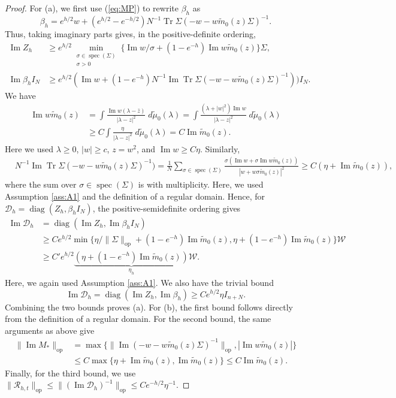 \documentclass[11pt,reqno]{amsart}
\def\cR{\mathcal{R}}
\def\cW{\mathcal{W}}
\def\cD{\mathcal{D}}
\def\Im{\operatorname{Im}}
\def\op{\mathrm{op}}
\def\Tr{\operatorname{Tr}}
\def\diag{\operatorname{diag}}
\def\spec{\operatorname{spec}}
\theoremstyle{definition}
\numberwithin{equation}{section}
\numberwithin{figure}{section}
\begin{document}
\begin{proof}
For (a), we first use (\ref{eq:MP}) to rewrite $\beta_h$ as
\[
    \beta_h=e^{h/2}w+(e^{h/2}-e^{-h/2})N^{-1}\Tr\Sigma(-w-w\widetilde m_0(z)\Sigma)^{-1}.
\]
Thus, taking imaginary parts gives, in the positive-definite ordering,
\begin{align*}
    \Im Z_{h}&\geq e^{h/2}\min_{\substack{\sigma\in\spec(\Sigma)\\\sigma>0}}\{\Im{w}/\sigma+(1-e^{-h})\Im{w\widetilde{m}_0(z)}\}\Sigma,\\
    \Im\beta_{h}I_N&\geq e^{h/2}(\Im{w}+(1-e^{-h})N^{-1}\Im\Tr\Sigma(-w-w\widetilde m_0(z)\Sigma)^{-1}))I_N.
\end{align*}
We have
\begin{align*}
    \Im{w\widetilde m_0(z)}&=\int\frac{\Im{w(\lambda-\bar z)}}{|\lambda-z|^2}\;d\widetilde\mu_0(\lambda)=\int\frac{(\lambda+|w|^2)\Im w}{|\lambda-z|^2}\;d\widetilde\mu_0(\lambda)\\
    &\geq C\int\frac{\eta}{|\lambda-z|^2}\;d\widetilde\mu_0(\lambda)=C\Im\widetilde m_0(z).
\end{align*}
Here we used $\lambda\geq 0$, $|w|\geq c$, $z=w^2$, and $\Im w\geq C\eta$. Similarly,
\begin{align*}
    &N^{-1}\Im\Tr\Sigma(-w-w\widetilde m_0(z)\Sigma)^{-1})=\frac{1}{N}\sum_{\sigma\in\spec(\Sigma)}\frac{\sigma(\Im{w}+\sigma\Im{w\widetilde m_0(z)})}{|w+w\sigma\widetilde m_0(z)|^2}\geq C(\eta+\Im\widetilde m_0(z)),
\end{align*}
where the sum over $\sigma\in\spec(\Sigma)$ is with multiplicity.
Here, we used Assumption \ref{ass:A1} and the definition of a regular domain. Hence, for $\cD_h=\diag(Z_h,\beta_h I_N)$, the positive-semidefinite ordering gives
\begin{align*}
    \Im\cD_h&=\diag(\Im Z_{h},\Im\beta_{h}I_N)\\
    &\geq Ce^{h/2}\min\{\eta/\|\Sigma\|_\op+(1-e^{-h})\Im{\widetilde m_0(z)},\eta+(1-e^{-h})\Im\widetilde m_0(z)\}\cW\\
    &\geq C'e^{h/2}\underbrace{(\eta+(1-e^{-h})\Im\widetilde m_0(z))}_{\eta_h}\cW .
\end{align*}
Here, we again used Assumption \ref{ass:A1}. We also have the trivial bound
\[
    \Im\cD_h=\diag(\Im Z_{h},\Im\beta_{h})\geq Ce^{h/2}\eta I_{n+N} . 
\]
Combining the two bounds proves (a). For (b), the first bound follows directly from the definition of a regular domain. For the second bound, the same arguments as above give
\begin{align*}
    \|\Im M_*\|_\op&=\max\{\|\Im(-w-w\widetilde m_0(z)\Sigma)^{-1}\|_\op,|\Im w\widetilde m_0(z)|\}\\
    &\leq C\max\{\eta+\Im \widetilde m_0(z),\Im\widetilde m_0(z)\}\leq C\Im\widetilde m_0(z).
\end{align*}
Finally, for the third bound, we use $\|\cR_{h,t}\|_\op\leq \|(\Im\cD_h)^{-1}\|_\op\leq Ce^{-h/2}\eta^{-1}$.


\end{proof}
\end{document}
